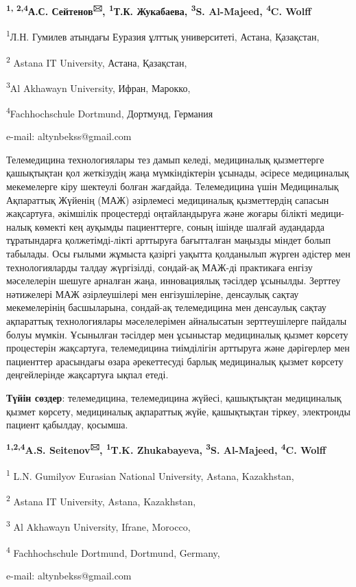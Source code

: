 \begin{center}
{\bfseries \textsuperscript{1, 2,4}А.С. Сейтенов\textsuperscript{🖂},
\textsuperscript{1}Т.К. Жукабаева, \textsuperscript{3}S. Al-Majeed,
\textsuperscript{4}C. Wolff}

\textsuperscript{1}Л.Н. Гумилев атындағы Еуразия ұлттық университеті,
Астана, Қазақстан,

\textsuperscript{2} Astana IT University, Астана, Қазақстан,

\textsuperscript{3}Al Akhawayn University, Ифран, Марокко,

\textsuperscript{4}Fachhochschule Dortmund, Дортмунд, Германия

e-mail: altynbekss@gmail.com
\end{center}

Телемедицина технологиялары тез дамып келеді, медициналық қызметтерге
қашықтықтан қол жеткізудің жаңа мүмкіндіктерін ұсынады, әсіресе
медициналық мекемелерге кіру шектеулі болған жағдайда. Телемедицина үшін
Медициналық Ақпараттық Жүйенің (МАЖ) әзірлемесі медициналық қызметтердің
сапасын жақсартуға, әкімшілік процестерді оңтайландыруға және жоғары
білікті медици-налық көмекті кең ауқымды пациенттерге, соның ішінде
шалғай аудандарда тұратындарға қолжетімді-лікті арттыруға бағытталған
маңызды міндет болып табылады. Осы ғылыми жұмыста қазіргі уақытта
қолданылып жүрген әдістер мен технологияларды талдау жүргізілді,
сондай-ақ МАЖ-ді практикаға енгізу мәселелерін шешуге арналған жаңа,
инновациялық тәсілдер ұсынылды. Зерттеу нәтижелері МАЖ әзірлеушілері мен
енгізушілеріне, денсаулық сақтау мекемелерінің басшыларына, сондай-ақ
телемедицина мен денсаулық сақтау ақпараттық технологиялары
мәселелерімен айналысатын зерттеушілерге пайдалы болуы мүмкін. Ұсынылған
тәсілдер мен ұсыныстар медициналық қызмет көрсету процестерін
жақсартуға, телемедицина тиімділігін арттыруға және дәрігерлер мен
пациенттер арасындағы өзара әрекеттесуді барлық медициналық қызмет
көрсету деңгейлерінде жақсартуға ықпал етеді.

{\bfseries Түйін сөздер}: телемедицина, телемедицина жүйесі, қашықтықтан
медициналық қызмет көрсету, медициналық ақпараттық жүйе, қашықтықтан
тіркеу, электронды пациент қабылдау, қосымша.


\begin{center}
{\bfseries \textsuperscript{1,2,4}A.S. Seitenov\textsuperscript{🖂},
\textsuperscript{1}T.K. Zhukabayeva, \textsuperscript{3}S. Al-Majeed,
\textsuperscript{4}C. Wolff}

\textsuperscript{1} L.N. Gumilyov Eurasian National University, Astana,
Kazakhstan,

\textsuperscript{2} Astana IT University, Astana, Kazakhstan,

\textsuperscript{3} Al Akhawayn University, Ifrane, Morocco,

\textsuperscript{4} Fachhochschule Dortmund, Dortmund, Germany,

e-mail: altynbekss@gmail.com
\end{center}

